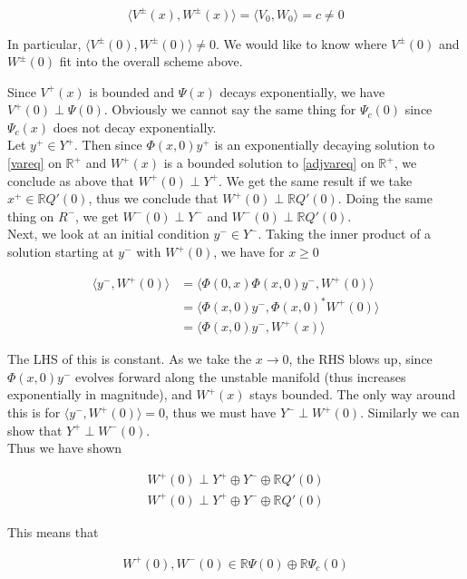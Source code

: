 \documentclass[12pt]{article}
\def\R{{\mathbb R}}
\begin{document}
\[
\langle V^\pm(x), W^\pm(x) \rangle = \langle V_0, W_0 \rangle = c \neq 0
\]

In particular, $\langle V^\pm(0), W^\pm(0) \rangle \neq 0$. We would like to know where $V^\pm(0)$ and $W^\pm(0)$ fit into the overall scheme above. 

Since $V^+(x)$ is bounded and $\Psi(x)$ decays exponentially, we have $V^+(0) \perp \Psi(0)$. Obviously we cannot say the same thing for $\Psi_c(0)$ since $\Psi_c(x)$ does not decay exponentially.\\

Let $y^+ \in Y^+$. Then since $\Phi(x, 0)y^+$ is an exponentially decaying solution to \eqref{vareq} on $\R^+$ and $W^+(x)$ is a bounded solution to \eqref{adjvareq} on $\R^+$, we conclude as above that $W^+(0) \perp Y^+$. We get the same result if we take $x^+ \in \R Q'(0)$, thus we conclude that $W^+(0) \perp \R Q'(0)$. Doing the same thing on $R^-$, we get $W^-(0) \perp Y^-$ and $W^-(0) \perp \R Q'(0)$.\\

Next, we look at an initial condition $y^- \in Y^-$. Taking the inner product of a solution starting at $y^-$ with $W^+(0)$, we have for $x \geq 0$

\begin{align*}
\langle y^-, W^+(0) \rangle &= \langle \Phi(0, x) \Phi(x, 0) y^-, W^+(0) \rangle \\
&= \langle \Phi(x, 0) y^-, \Phi(x, 0)^* W^+(0) \rangle \\
&= \langle \Phi(x, 0) y^-, W^+(x) \rangle 
\end{align*}

The LHS of this is constant. As we take the $x \rightarrow 0$, the RHS blows up, since $\Phi(x, 0) y^-$ evolves forward along the unstable manifold (thus increases exponentially in magnitude), and $W^+(x)$ stays bounded. The only way around this is for $\langle y^-, W^+(0) \rangle = 0$, thus we must have $Y^- \perp W^+(0)$. Similarly we can show that $Y^+ \perp W^-(0)$.\\ 

Thus we have shown

\begin{align*}
W^+(0) \perp Y^+ \oplus Y^- \oplus \R Q'(0) \\
W^+(0) \perp Y^+ \oplus Y^- \oplus \R Q'(0)
\end{align*}

This means that 

\begin{align*}
W^+(0), W^-(0) \in \R \Psi(0) \oplus \R \Psi_c(0) \\
\end{align*}
\end{document}
